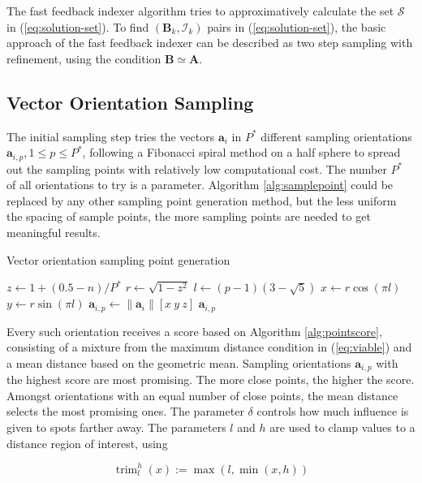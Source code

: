 \documentclass[a4paper,10pt]{article}
\DeclareMathOperator{\trimop}{trim}
\newcommand{\vect}[1]{\mathbf{#1}}
\newcommand{\mat}[1]{\mathbf{#1}}
\newcommand{\trim}[3]{\trimop_{#1}^{#2}\left ( #3 \right )}
\begin{document}
The fast feedback indexer algorithm tries to approximatively calculate the set $\mathcal{S}$ in (\ref{eq:solution-set}). To find $(\mat{B}_k,\mathcal{I}_k)$ pairs in (\ref{eq:solution-set}), the basic approach of the fast feedback indexer can be described as two step sampling with refinement, using the condition $\mat{B} \simeq \mat{A}$.

\subsection{Vector Orientation Sampling}\label{subsec:vecsampling}
The initial sampling step tries the vectors $\vect{a}_i$ in $P^*$ different sampling orientations $\vect{a}_{i,p}, 1\leq p\leq P^*$, following a Fibonacci spiral method \cite{gonzales} on a half sphere to spread out the sampling points with relatively low computational cost. The number $P^*$ of all orientations to try is a parameter. Algorithm \ref{alg:samplepoint} could be replaced by any other sampling point generation method, but the less uniform the spacing of sample points, the more sampling points are needed to get meaningful results.

\begin{algorithm}
\caption{Vector orientation sampling point generation}
\label{alg:samplepoint}
\begin{algorithmic}[1]
\Function{sample-point}{$\vect{a}_i,p,P^*$}
\State $z\gets 1 + (0.5 - n)/P^*$
\State $r\gets \sqrt{1 - z^2}$
\State $l\gets (p - 1)(3 - \sqrt{5})$
\State $x\gets r \cos(\pi l)$
\State $y\gets r \sin(\pi l)$
\State $\vect{a}_{i,p}\gets \|\vect{a}_i\| [x\ y\ z]$
\State \Return $\vect{a}_{i,p}$
\EndFunction
\end{algorithmic}
\end{algorithm}

Every such orientation receives a score based on Algorithm \ref{alg:pointscore}, consisting of a mixture from the maximum distance condition in (\ref{eq:viable}) and a mean distance based on the geometric mean. Sampling orientations $\vect{a}_{i,p}$ with the highest score are most promising. The more close points, the higher the score. Amongst orientations with an equal number of close points, the mean distance selects the most promising ones. The parameter $\delta$ controls how much influence is given to spots farther away. The parameters $l$ and $h$ are used to clamp values to a distance region of interest, using

\[
  \trim{l}{h}{x} := \max(l, \min(x, h))
\]
\end{document}
